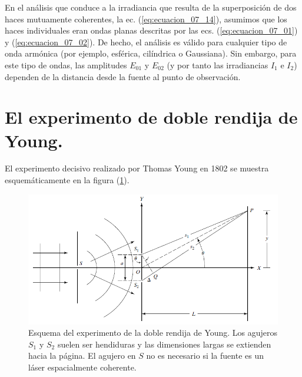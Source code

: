 \documentclass[14pt]{extarticle}
\begin{document}
En el análisis que conduce a la irradiancia que resulta de la superposición de dos haces mutuamente coherentes, la ec. (\ref{eq:ecuacion_07_14}), asumimos que los haces individuales eran ondas planas descritas por las ecs. (\ref{eq:ecuacion_07_01}) y (\ref{eq:ecuacion_07_02}). De hecho, el análisis es válido para cualquier tipo de onda armónica (por ejemplo, esférica, cilíndrica o Gaussiana). Sin embargo, para este tipo de ondas, las amplitudes $E_{01}$ y $E_{02}$ (y por tanto las irradiancias $I_{1}$ e $I_{2}$) dependen de la distancia desde la fuente al punto de observación.

\section{El experimento de doble rendija de Young.}

El experimento decisivo realizado por Thomas Young en 1802 se muestra esquemáticamente en la figura (\ref{fig:figura_07_03}).
\begin{figure}[H]
    \centering
    \includegraphics[scale=0.8]{Imagenes/Interferencia2_03.png}
    \caption{Esquema del experimento de la doble rendija de Young. Los agujeros $S_{1}$ y $S_{2}$ suelen ser hendiduras y las dimensiones largas se extienden hacia la página. El agujero en $S$ no es necesario si la fuente es un láser espacialmente coherente.}
    \label{fig:figura_07_03}
\end{figure}
\end{document}

